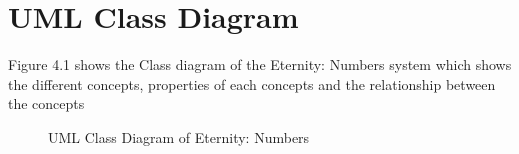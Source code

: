 \documentclass[12pt, a4paper]{report}
\begin{document}
\section{UML Class Diagram}
Figure 4.1 shows the Class diagram of the Eternity: Numbers system which shows the different concepts, properties of each concepts and the relationship between the concepts
\begin{figure}
    \centering
    \caption{UML Class Diagram of Eternity: Numbers}
    \label{fig:UML Class Diagram of Eternity: Numbers}
\end{figure}
\end{document}
